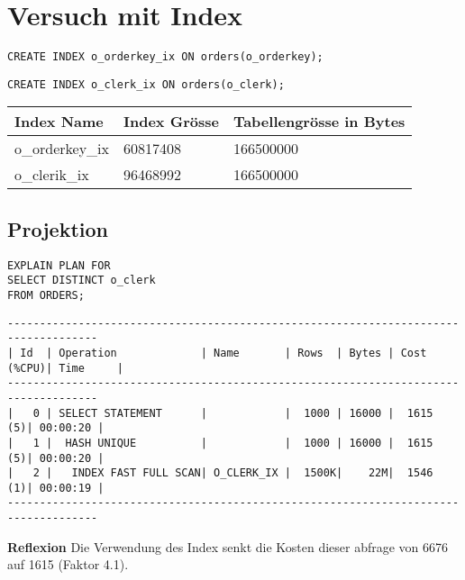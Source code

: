 \documentclass[10pt]{article}
\begin{document}
\section{Versuch mit Index}
\begin{lstlisting}[style=sql]
CREATE INDEX o_orderkey_ix ON orders(o_orderkey);
\end{lstlisting}
\begin{lstlisting}[style=sql]
CREATE INDEX o_clerk_ix ON orders(o_clerk);
\end{lstlisting}
{\normalsize
\begin{tabular}{|l|l|l|}
\hline
 Index Name & Index Grösse & Tabellengrösse in Bytes \\
\hline
\hline
o\_orderkey\_ix & 60817408 & 166500000 \\
\hline
o\_clerik\_ix & 96468992	 & 166500000 \\
\hline
\end{tabular}
}

\subsection{Projektion}
\begin{lstlisting}[style=sql]
EXPLAIN PLAN FOR
SELECT DISTINCT o_clerk
FROM ORDERS;
\end{lstlisting}
\begin{lstlisting}[style=queryexecutionplan]
------------------------------------------------------------------------------------
| Id  | Operation             | Name       | Rows  | Bytes | Cost (%CPU)| Time     |
------------------------------------------------------------------------------------
|   0 | SELECT STATEMENT      |            |  1000 | 16000 |  1615   (5)| 00:00:20 |
|   1 |  HASH UNIQUE          |            |  1000 | 16000 |  1615   (5)| 00:00:20 |
|   2 |   INDEX FAST FULL SCAN| O_CLERK_IX |  1500K|    22M|  1546   (1)| 00:00:19 |
------------------------------------------------------------------------------------
\end{lstlisting}
\textbf{Reflexion} \newline
Die Verwendung des Index senkt die Kosten dieser abfrage von 6676 auf 1615 (Faktor 4.1).
\end{document}
